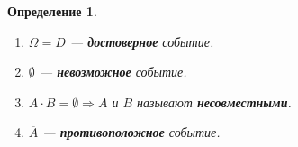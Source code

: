 \documentclass[10pt,a4paper,oneside,titlepage]{book}
\theoremstyle{plain}
\theoremstyle{defenition}
\newtheorem{defenition}{Определение}[section]
\theoremstyle{remark}
\begin{document}
\begin{defenition}
	\begin{enumerate}
		\item $\Omega=D$ --- {\bfseries достоверное} событие.
		\item $\emptyset$ --- {\bfseries невозможное} событие.
		\item $A\cdot B=\emptyset\Rightarrow A$ и $B$ называют {\bfseries несовместными}.
		\item $\overline{A}$ --- {\bfseries противоположное} событие.
	\end{enumerate}
\end{defenition}
\end{document}
